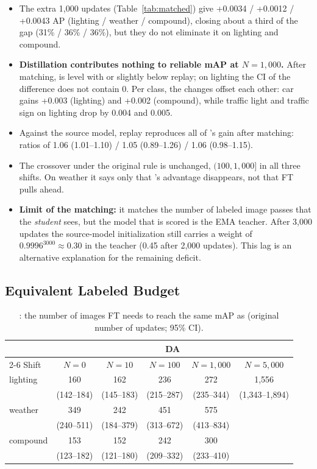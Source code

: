 \begin{itemize}
\item The extra 1,000 updates (Table~\ref{tab:matched}) give \aldi +0.0034 / +0.0012 / +0.0043 AP (lighting / weather / compound), closing about a third of the gap (31\% / 36\% / 36\%), but they do not eliminate it on lighting and compound.
\item \textbf{Distillation contributes nothing to reliable mAP at $N = 1{,}000$.} After matching, \aldi is level with or slightly below replay; on lighting the CI of the difference does not contain 0. Per class, the changes offset each other: car gains +0.003 (lighting) and +0.002 (compound), while traffic light and traffic sign on lighting drop by 0.004 and 0.005.
\item Against the source model, replay reproduces all of \aldi's gain after matching: ratios of 1.06 (1.01--1.10) / 1.05 (0.89--1.26) / 1.06 (0.98--1.15).
\item The crossover \Nx under the original rule is unchanged, $(100, 1{,}000]$ in all three shifts. On weather it says only that \aldi's advantage disappears, not that FT pulls ahead.
\item \textbf{Limit of the matching:} it matches the number of labeled image passes that the \emph{student} sees, but the model that is scored is the EMA teacher. After 3,000 updates the source-model initialization still carries a weight of $0.9996^{3000} \approx 0.30$ in the teacher (0.45 after 2,000 updates). This lag is an alternative explanation for the remaining deficit.
\end{itemize}

\subsection{Equivalent Labeled Budget}\label{sec:neq}

\begin{table}[t]
\centering
\caption{\Neq: the number of images FT needs to reach the same mAP as \aldi (original number of updates; 95\% CI).}
\label{tab:neq}
\footnotesize
\setlength{\tabcolsep}{3pt}
\begin{tabular}{@{}lccccc@{}}
\toprule
 & \multicolumn{5}{c}{DA} \\
\cmidrule(l){2-6}
Shift & $N = 0$ & $N = 10$ & $N = 100$ & $N = 1{,}000$ & $N = 5{,}000$ \\
\midrule
lighting & 160 & 162 & 236 & 272 & 1,556 \\
 & (142--184) & (145--183) & (215--287) & (235--344) & (1,343--1,894) \\
\addlinespace[2pt]
weather & 349 & 242 & 451 & 575 & \\
 & (240--511) & (184--379) & (313--672) & (413--834) & \\
\addlinespace[2pt]
compound & 153 & 152 & 242 & 300 & \\
 & (123--182) & (121--180) & (209--332) & (233--410) & \\
\bottomrule
\end{tabular}
\end{table}

